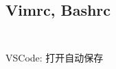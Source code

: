 \documentclass[titlepage, a4paper]{article}
\begin{document}
\begin{multicols}{2}
\begin{spacing}{0.6}
				\subsection*{Vimrc, Bashrc}
				\inputminted{vim}{src/Miscellany/vimrc}
				\inputminted{sh}{src/Miscellany/bashrc}
				VSCode: 打开自动保存

		\end{spacing}
		\endgroup
	\end{multicols}
\end{document}

